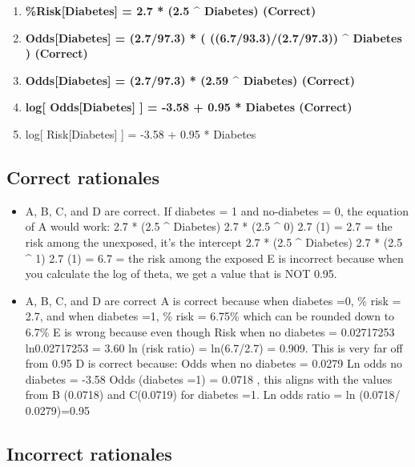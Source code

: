\documentclass[letterpaper,9pt,twoside,]{pinp}
\providecommand{\tightlist}{%
  \setlength{\itemsep}{0pt}\setlength{\parskip}{0pt}}
\begin{document}
\begin{enumerate}
\def\labelenumi{\alph{enumi}.}
\tightlist
\item
  \textbf{\%Risk{[}Diabetes{]} = 2.7 * (2.5 \^{} Diabetes) (Correct)}
\item
  \textbf{Odds{[}Diabetes{]} = (2.7/97.3) * ( ((6.7/93.3)/(2.7/97.3))
  \^{} Diabetes ) (Correct)}
\item
  \textbf{Odds{[}Diabetes{]} = (2.7/97.3) * (2.59 \^{} Diabetes)
  (Correct)}
\item
  \textbf{log{[} Odds{[}Diabetes{]} {]} = -3.58 + 0.95 * Diabetes
  (Correct)}
\item
  log{[} Risk{[}Diabetes{]} {]} = -3.58 + 0.95 * Diabetes
\end{enumerate}

\hypertarget{correct-rationales-7}{%
\subsection{Correct rationales}\label{correct-rationales-7}}

\begin{itemize}
\tightlist
\item
  A, B, C, and D are correct. If diabetes = 1 and no-diabetes = 0, the
  equation of A would work: 2.7 * (2.5 \^{} Diabetes) 2.7 * (2.5 \^{} 0)
  2.7 (1) = 2.7 = the risk among the unexposed, it's the intercept 2.7 *
  (2.5 \^{} Diabetes) 2.7 * (2.5 \^{} 1) 2.7 (1) = 6.7 = the risk among
  the exposed E is incorrect because when you calculate the log of
  theta, we get a value that is NOT 0.95.
\item
  A, B, C, and D are correct A is correct because when diabetes =0, \%
  risk = 2.7, and when diabetes =1, \% risk = 6.75\% which can be
  rounded down to 6.7\% E is wrong because even though Risk when no
  diabetes = 0.02717253 ln0.02717253 = 3.60 ln (risk ratio) =
  ln(6.7/2.7) = 0.909. This is very far off from 0.95 D is correct
  because: Odds when no diabetes = 0.0279 Ln odds no diabetes = -3.58
  Odds (diabetes =1) = 0.0718 , this aligns with the values from B
  (0.0718) and C(0.0719) for diabetes =1. Ln odds ratio = ln (0.0718/
  0.0279)=0.95
\end{itemize}

\hypertarget{incorrect-rationales-7}{%
\subsection{Incorrect rationales}\label{incorrect-rationales-7}}
\end{document}
